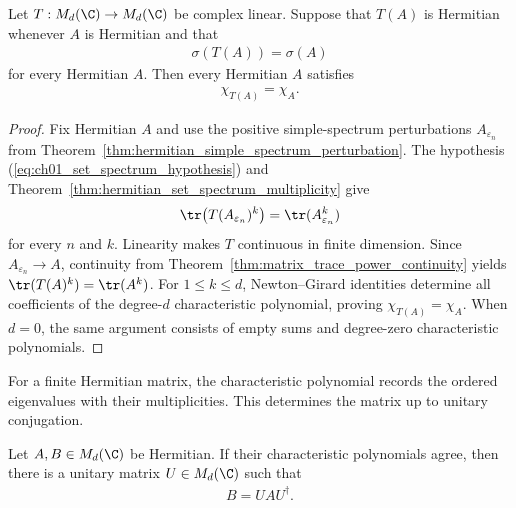 \begin{theorem}
    \label{thm:hermitian_set_spectrum_charpoly}
    \leanok
    Let $T:M_d(\C)\to M_d(\C)$ be complex linear. Suppose that $T(A)$ is
    Hermitian whenever $A$ is Hermitian and that
    \begin{align}
        \sigma(T(A))=\sigma(A)
        \label{eq:ch01_set_spectrum_hypothesis}
    \end{align}
    for every Hermitian $A$. Then every Hermitian $A$ satisfies
    \begin{align}
        \chi_{T(A)}=\chi_A.
    \end{align}
\end{theorem}

\begin{proof}\leanok
    Fix Hermitian $A$ and use the positive simple-spectrum perturbations
    $A_{\varepsilon_n}$ from
    Theorem~\ref{thm:hermitian_simple_spectrum_perturbation}. The hypothesis
    (\ref{eq:ch01_set_spectrum_hypothesis}) and
    Theorem~\ref{thm:hermitian_set_spectrum_multiplicity} give
    \begin{align}
        \tr\bigl(T(A_{\varepsilon_n})^k\bigr)
        =\tr(A_{\varepsilon_n}^k)
    \end{align}
    for every $n$ and $k$. Linearity makes $T$ continuous in finite
    dimension. Since $A_{\varepsilon_n}\to A$, continuity from
    Theorem~\ref{thm:matrix_trace_power_continuity} yields
    $\tr(T(A)^k)=\tr(A^k)$. For $1\le k\le d$, Newton--Girard identities
    determine all coefficients of the degree-$d$ characteristic polynomial,
    proving $\chi_{T(A)}=\chi_A$. When $d=0$, the same argument consists of
    empty sums and degree-zero characteristic polynomials.
\end{proof}



For a finite Hermitian matrix, the characteristic polynomial records the
ordered eigenvalues with their multiplicities. This determines the matrix up
to unitary conjugation.

\begin{theorem}
    \label{thm:hermitian_charpoly_unitary_conjugacy}
    \leanok
    Let $A,B\in M_d(\C)$ be Hermitian. If their characteristic polynomials
    agree, then there is a unitary matrix $U\in M_d(\C)$ such that
    \begin{align}
        B=UAU^\dagger.
    \end{align}
\end{theorem}

